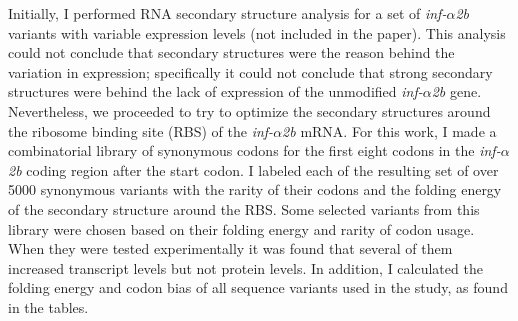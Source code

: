 Initially, I performed RNA secondary structure analysis for a set of
\textit{inf-$\alpha$2b} variants with variable expression levels (not included
in the paper). This analysis could not conclude that secondary structures were
the reason behind the variation in expression; specifically it could not conclude
that strong secondary structures were behind the lack of expression of the
unmodified \textit{inf-$\alpha$2b} gene. Nevertheless, we proceeded to try to
optimize the secondary structures around the ribosome binding site (RBS) of the
\textit{inf-$\alpha$2b} mRNA. For this work, I made a combinatorial library of
synonymous codons for the first eight codons in the \textit{inf-$\alpha$2b}
coding region after the start codon. I labeled each of the resulting set of
over 5000 synonymous variants with the rarity of their codons and the folding
energy of the secondary structure around the RBS. Some selected variants from
this library were chosen based on their folding energy and rarity of codon
usage. When they were tested experimentally it was found that several of them
increased transcript levels but not protein levels. In addition, I calculated
the folding energy and codon bias of all sequence variants used in the study,
as found in the tables.

